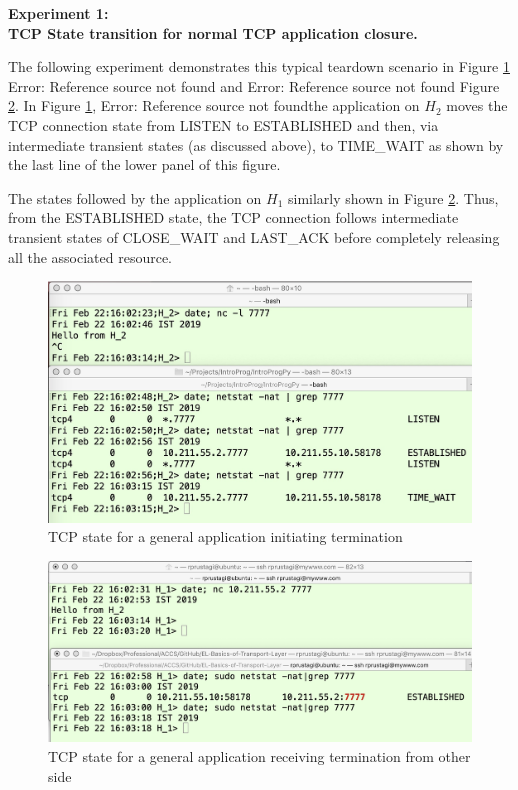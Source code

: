 \begin{multicols}{2}
\medskip
\noindent
\textbf{Experiment 1:\\ TCP State transition for normal TCP application closure.}
\smallskip

The following experiment demonstrates this typical teardown scenario in Figure \ref{chap3-fig3} Error: Reference source not found and Error: Reference source not found Figure \ref{chap3-fig4}. In Figure \ref{chap3-fig3}, Error: Reference source not foundthe application on $H_{2}$ moves the TCP connection state from LISTEN to ESTABLISHED and then, via intermediate transient states (as discussed above), to TIME\_WAIT as shown by the last line of the lower panel of this figure.

The states followed by the application on $H_{1}$ similarly shown in Figure \ref{chap3-fig4}. Thus, from the ESTABLISHED state, the TCP connection follows intermediate transient states of CLOSE\_WAIT and LAST\_ACK before completely releasing all the associated resource.
\end{multicols}

\begin{figure}[!htb]
\centering
\includegraphics[scale=.25]{src/Figures/chap3/3.jpg}
\caption{TCP state for a general application initiating termination}\label{chap3-fig3}
\end{figure}

\begin{figure}[!htb]
\centering
\includegraphics[scale=.45]{src/Figures/chap3/4.jpg}
\caption{TCP state for a general application receiving termination from other side}\label{chap3-fig4}
\end{figure}


